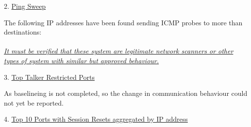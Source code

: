 \noindent
\begin{minipage}{1\textwidth}
\begin{addmargin}[10pt]{0pt}
2. \underline{Ping Sweep}
   \begin{addmargin}[15pt]{0pt}
   The following IP addresses have been found sending ICMP probes to more than destinations:\\
   \\
   \small{\underline{\textit{It must be verified that these system are legitimate network scanners or other types of system with similar but approved behaviour.}}}\\
   \end{addmargin}
\end{addmargin}
\end{minipage}
%
\noindent
\begin{minipage}{1\textwidth}
\begin{addmargin}[10pt]{0pt}
3. \underline{Top Talker Restricted Ports}
   \begin{addmargin}[15pt]{0pt}
   As baselineing is not completed, so the change in communication behaviour could not yet be reported.\\
   \end{addmargin}
\end{addmargin}
\end{minipage}
%
\noindent
\begin{minipage}{1\textwidth}
\begin{addmargin}[10pt]{0pt}
4. \underline{Top 10 Ports with Session Resets aggregated by IP address}
   \begin{addmargin}[15pt]{0pt}


   \end{addmargin}

\end{addmargin}
\end{minipage}

